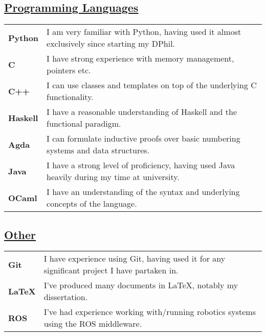 \documentclass[11pt]{article}
\begin{document}
		\subsection*{\underline{Programming Languages}}
		\renewcommand{\arraystretch}{1.3}%
		\begin{tabular}[20pt]{ll}
		        \textbf{Python} & I am very familiar with Python, having used it almost exclusively since starting my DPhil. \\
			\textbf{C} & I have strong experience with memory management, pointers etc. \\
			\textbf{C++} & I can use classes and templates on top of the underlying C functionality. \\
			\textbf{Haskell} & I have a reasonable understanding of Haskell and the functional paradigm.\\
			\textbf{Agda} & I can formulate inductive proofs over basic numbering systems and data structures.\\
			 \textbf{Java} &  I have a strong level of proficiency, having used Java heavily during my time at university.\\
			 \textbf{OCaml} & I have an understanding of the syntax and underlying concepts of the language.\\
		\end{tabular} 
		\subsection*{\underline{Other}}
		\renewcommand{\arraystretch}{1.3}%
		\begin{tabular}{ll}
			 \textbf{Git} & I have experience using Git, having used it for any significant project I have partaken in.\\
			\textbf{LaTeX} & I've produced many documents in LaTeX, notably my dissertation.\\
			\textbf{ROS} & I've had experience working with/running robotics systems using the ROS middleware.
		\end{tabular}
	
\end{document}
